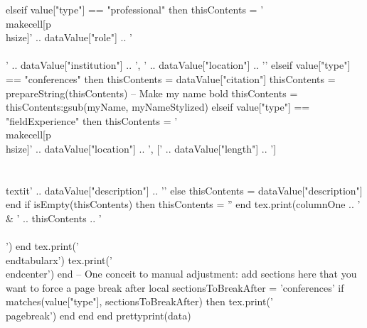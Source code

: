 \documentclass[letterpaper, 10pt]{article}
\begin{document}
\begin{luacode}
					elseif value["type"] == "professional" then
						thisContents = '\\makecell[{{p{\\hsize}}}]{' .. dataValue["role"] .. ' \\\\ ' .. dataValue["institution"] .. ', ' .. dataValue["location"] .. '}'
					elseif value["type"] == "conferences" then
						thisContents = dataValue["citation"]
						thisContents =  prepareString(thisContents)
						-- Make my name bold
						thisContents = thisContents:gsub(myName,  myNameStylized)
					elseif value["type"] == "fieldExperience" then
						thisContents = '\\makecell[{{p{\\hsize}}}]{' .. dataValue["location"] .. ', [' .. dataValue["length"] .. '] \\\\ \\textit{' .. dataValue["description"] .. '}}'
					else
						thisContents = dataValue["description"]
					end
					if isEmpty(thisContents) then
						thisContents = ''
					end
					tex.print(columnOne .. ' & ' .. thisContents .. ' \\\\')
				end
				tex.print('\\end{tabularx}')
				tex.print('\\end{center}')
			end
			-- One conceit to manual adjustment: add sections here that you want to force a page break after
			local sectionsToBreakAfter = {'conferences'}
			if matches(value["type"], sectionsToBreakAfter) then
				tex.print('\\pagebreak')
			end
		end
	end
	prettyprint(data)
\end{luacode}
\end{document}
